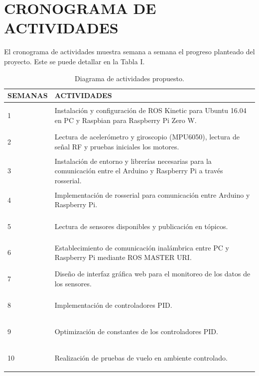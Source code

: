 \documentclass[letterpaper, 10 pt, conference]{ieeeconf}  %
\begin{document}
\section{CRONOGRAMA DE ACTIVIDADES}
El cronograma de actividades muestra semana a semana el progreso planteado del proyecto. Este se puede detallar en la Tabla I.

\begin{center}
\begin{table}
 \label{tabla_actividades} 
 \caption{Diagrama de actividades propuesto.}
 \begin{tabular}{| m{1.5cm} | m{6cm}|}
 
 \hline
 SEMANAS & ACTIVIDADES \\ [0.5ex] 
 \hline\hline
 \begin{center}1\end{center}  & Instalación y configuración de ROS Kinetic para Ubuntu 16.04 en PC y Raspbian para Raspberry Pi Zero W. \\
 \hline
 \begin{center}2\end{center} &  Lectura de acelerómetro y giroscopio (MPU6050), lectura de señal RF y pruebas iniciales los motores.\\
 \hline
 \begin{center}3\end{center} & Instalación de entorno y librerías necesarias para la comunicación entre el Arduino y Raspberry Pi a través rosserial. \\
 \hline
 \begin{center}4\end{center} & Implementación de rosserial para comunicación entre Arduino y Raspberry Pi.   \\
 \hline
 \begin{center}5\end{center} & Lectura de sensores disponibles y publicación en tópicos.\\
 \hline
 \begin{center}6\end{center} & Establecimiento de comunicación inalámbrica entre PC y Raspberry Pi mediante ROS MASTER URI. \\
 \hline
 \begin{center}7\end{center} & Diseño de interfaz gráfica web para el monitoreo de los datos de los sensores. \\
 \hline
  \begin{center}8\end{center} & Implementación de controladores PID. \\
 \hline
 \begin{center}9\end{center} & Optimización de constantes de los controladores PID.  \\
 \hline
 \begin{center}10\end{center} & Realización de pruebas de vuelo en ambiente controlado.\\ [1ex] 
 \hline
\end{tabular}


\end{table}
\end{center}
\end{document}
